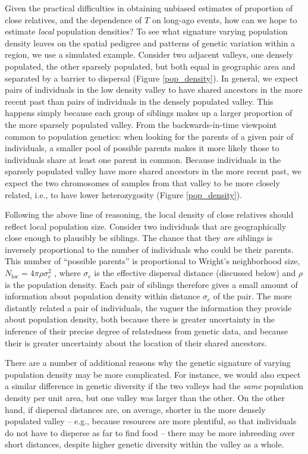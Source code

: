 \documentclass{ar-1col}
\begin{document}
Given the practical difficulties in obtaining unbiased estimates of proportion of close relatives,
and the dependence of $T$ on long-ago events,
how can we hope to estimate \textit{local} population densities?
To see what signature varying population density leaves 
on the spatial pedigree and patterns of genetic variation
within a region,
we use a simulated example.
Consider two adjacent valleys, 
one densely populated, the other sparsely populated, 
but both equal in geographic area 
and separated by a barrier to dispersal (Figure \ref{pop_density}).
In general, we expect pairs of individuals in the low density valley 
to have shared ancestors in the more recent past than 
pairs of individuals in the densely populated valley.
This happens simply because 
each group of siblings makes up a larger proportion 
of the more sparsely populated valley.
From the backwards-in-time viewpoint common to population genetics:
when looking for the parents of a given pair of individuals,
a smaller pool of possible parents
makes it more likely those to individuals share at least one parent in common.
Because individuals in the sparsely populated valley have more shared ancestors 
in the more recent past, 
we expect the two chromosomes of samples from that valley to be more closely related,
i.e., to have lower heterozygosity 
(Figure \ref{pop_density}).

Following the above line of reasoning,
the local density of close relatives 
should reflect local population size.
Consider two individuals that are geographically close enough to plausibly be siblings.
The chance that they \textit{are} siblings is inversely proportional to
the number of individuals who could be their parents.
This number of ``possible parents'' is proportional to
Wright's neighborhood size, $N_\text{loc} = 4 \pi \rho \sigma_e^2$ \citep{wright1946isolation},
where $\sigma_e$ is the effective dispersal distance (discussed below)
and $\rho$ is the population density.
Each pair of siblings therefore gives a small amount of information
about population density within distance $\sigma_e$ of the pair.
The more distantly related a pair of individuals, 
the vaguer the information they provide about population density,
both because there is greater uncertainty 
in the inference of their precise degree of relatedness from genetic data,
and because their is greater uncertainty about the location 
of their shared ancestors.

There are a number of additional reasons why the genetic signature 
of varying population density may be more complicated.
For instance, we would also expect a similar difference in genetic diversity
if the two valleys had the \textit{same} population density per unit area,
but one valley was larger than the other.
On the other hand, if dispersal distances are, on average, shorter 
in the more densely populated valley -- 
e.g., because resources are more plentiful, 
so that individuals do not have to disperse as far to find food -- 
there may be more inbreeding over short distances,
despite higher genetic diversity within the valley as a whole.
\end{document}

